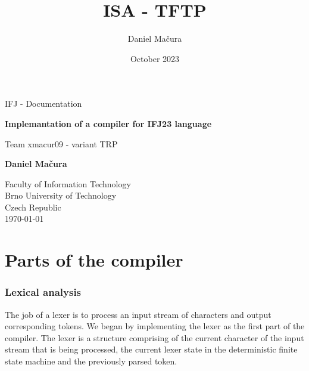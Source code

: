 \documentclass[11pt]{article}
\title{ISA - TFTP}
\author{Daniel Mačura}
\date{October 2023}
\begin{document}
\begin{titlepage}
    \begin{center}
        \vspace*{1cm}
        
        \LARGE
        IFJ - Documentation
            
        \Huge
        \textbf{Implemantation of a compiler for IFJ23 language}
            
        \vspace{0.5cm}
        \LARGE
        Team xmacur09 - variant TRP
            
        \vspace{2.5cm}
            
        \textbf{{\Large Daniel Mačura}}
            
        \vfill
            
        \vspace{0.8cm}
            
            
        \Large
        Faculty of Information Technology\\
        Brno University of Technology\\
        Czech Republic\\
        \today
            
    \end{center}
\end{titlepage}
\newpage

\tableofcontents

\newpage


\part{Parts of the compiler}

\section{Lexical analysis}
The job of a lexer is to process an input stream of characters and output corresponding tokens. We began by implementing the lexer as the first part of the compiler. The lexer is a structure comprising of the current character of the input stream that is being processed, the current lexer state in the deterministic finite state machine and the previously parsed token.
\end{document}
